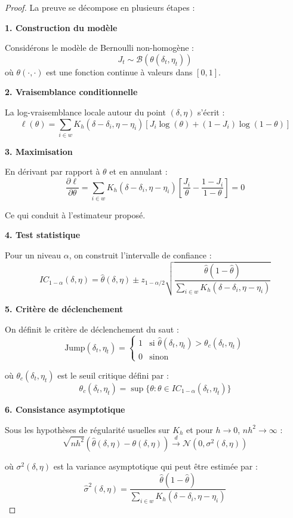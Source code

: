 \documentclass[12pt,a4paper]{article}
\theoremstyle{definition}
\theoremstyle{remark}
\begin{document}
\begin{proof}
La preuve se décompose en plusieurs étapes :

\textbf{1. Construction du modèle}

Considérons le modèle de Bernoulli non-homogène :
\[
J_t \sim \mathcal{B}(\theta(\delta_t, \eta_t))
\]
où $\theta(\cdot,\cdot)$ est une fonction continue à valeurs dans $[0,1]$.

\textbf{2. Vraisemblance conditionnelle}

La log-vraisemblance locale autour du point $(\delta, \eta)$ s'écrit :
\[
\ell(\theta) = \sum_{i \in w} K_h(\delta - \delta_i, \eta - \eta_i) [J_i \log(\theta) + (1-J_i)\log(1-\theta)]
\]

\textbf{3. Maximisation}

En dérivant par rapport à $\theta$ et en annulant :
\[
\frac{\partial \ell}{\partial \theta} = \sum_{i \in w} K_h(\delta - \delta_i, \eta - \eta_i) [\frac{J_i}{\theta} - \frac{1-J_i}{1-\theta}] = 0
\]

Ce qui conduit à l'estimateur proposé.

\textbf{4. Test statistique}

Pour un niveau $\alpha$, on construit l'intervalle de confiance :
\[
IC_{1-\alpha}(\delta, \eta) = \hat{\theta}(\delta, \eta) \pm z_{1-\alpha/2} \sqrt{\frac{\hat{\theta}(1-\hat{\theta})}{\sum_{i \in w} K_h(\delta - \delta_i, \eta - \eta_i)}}
\]

\textbf{5. Critère de déclenchement}

On définit le critère de déclenchement du saut :
\[
\text{Jump}(\delta_t, \eta_t) = \begin{cases}
1 & \text{si } \hat{\theta}(\delta_t, \eta_t) > \theta_c(\delta_t, \eta_t) \\
0 & \text{sinon}
\end{cases}
\]

où $\theta_c(\delta_t, \eta_t)$ est le seuil critique défini par :
\[
\theta_c(\delta_t, \eta_t) = \sup\{\theta : \theta \in IC_{1-\alpha}(\delta_t, \eta_t)\}
\]

\textbf{6. Consistance asymptotique}

Sous les hypothèses de régularité usuelles sur $K_h$ et pour $h \to 0$, $nh^2 \to \infty$ :
\[
\sqrt{nh^2}(\hat{\theta}(\delta, \eta) - \theta(\delta, \eta)) \xrightarrow{d} \mathcal{N}(0, \sigma^2(\delta, \eta))
\]

où $\sigma^2(\delta, \eta)$ est la variance asymptotique qui peut être estimée par :
\[
\hat{\sigma}^2(\delta, \eta) = \frac{\hat{\theta}(1-\hat{\theta})}{\sum_{i \in w} K_h(\delta - \delta_i, \eta - \eta_i)}
\]
\end{proof}
\end{document}
